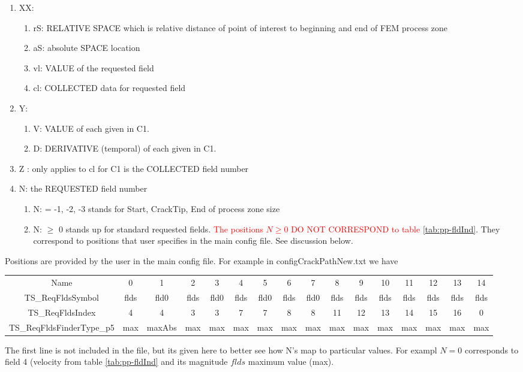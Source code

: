 \documentclass[10pt]{article}
\begin{document}
\begin{enumerate}		
\item	XX:
\begin{enumerate}
			\item rS:		RELATIVE SPACE which is relative distance of point of interest to beginning and end of FEM process zone
			\item aS:		absolute SPACE location
			\item vl:		VALUE	of the requested field
			\item cl:		COLLECTED data for requested field
\end{enumerate}
\item Y:
\begin{enumerate}
			\item	V:		VALUE of each given in C1.
			\item D:		DERIVATIVE (temporal) of each given in C1.
\end{enumerate}
\item Z	:	only applies to cl for C1		is the COLLECTED field number
\item N:		the REQUESTED field number 
\begin{enumerate}
			\item N:		= -1, -2, -3	stands for Start, CrackTip, End of process zone size
			\item N:		$\ge$ 0			stands up for standard requested fields. \textcolor{red}{The positions $N \ge 0$ DO NOT CORRESPOND to table \ref{tab:pp-fldInd}}. They correspond to positions that user specifies in the main config file. See discussion below.
\end{enumerate}
\end{enumerate}

Positions are provided by the user in the main config file. For example in configCrackPathNew.txt we have
{\scriptsize
\begin{tabular} {cccccccccccccccc}
Name	&	0	&1&2&3&4&5&6&7&8&9&10&11&12&13&14 \\
TS\_ReqFldsSymbol				&		flds	&fld0		&flds	&fld0	&flds	&fld0	&flds	&fld0	&flds	&flds	&flds	&flds	&flds	&flds	&flds \\
TS\_ReqFldsIndex						&4	&4		&3	&3	&7	&7	&8	&8	&11	&12	&13	&14	&15	&16	&0\\
TS\_ReqFldsFinderType\_p5					&max	&maxAbs	&max	&max	&max	&max	&max	&max	&max	&max	&max	&max	&max	&max	&max
\end{tabular}
}
The first line is not included in the file, but its given here to better see how N's map to particular values. For exampl $N = 0$ corresponds to field 4 (velocity from table \ref{tab:pp-fldInd} and its magnitude $flds$ maximum value (max). 
\end{document}
